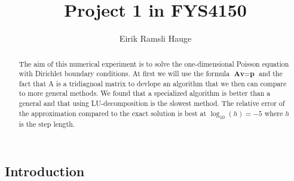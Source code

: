 \documentclass[12pt,a4paper]{article}
\author{Eirik Ramsli Hauge}
\title{Project 1 in FYS4150}
\newcommand{\V}[1]{\textbf{#1}}
\begin{document}
	\maketitle
	
\begin{abstract}
The aim of this numerical experiment is to solve the one-dimensional Poisson equation with Dirichlet boundary conditions. At first we will use the formula $\V{A} \V{v} = \V{p}$ and the fact that A is a tridiagnoal matrix to devlope an algorithm that we then can compare to more general methods. We found that a specialized algorithm is better than a general and that using LU-decomposition is the slowest method. The relative error of the approximation compared to the exact solution is best at $\log_{10}(h) = -5$ where $h$ is the step length.
\end{abstract}
\subsection*{Introduction}
\end{document}
